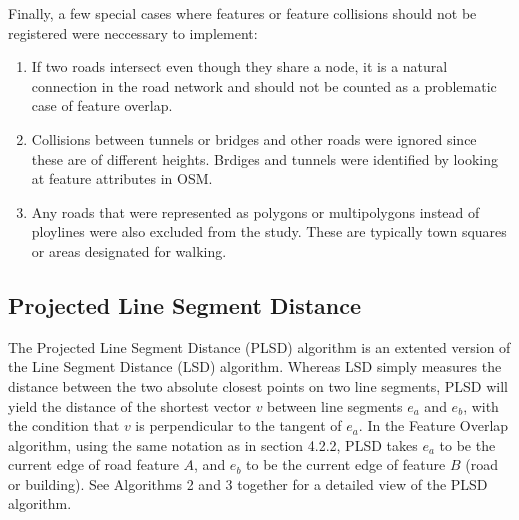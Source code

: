 \documentclass{kththesis}
\begin{document}
Finally, a few special cases where features or feature collisions should not be registered were neccessary to implement:
\begin{enumerate}
    \item If two roads intersect even though they share a node, it is a natural connection in the road network and should not be counted as a problematic case of feature overlap.
    \item Collisions between tunnels or bridges and other roads were ignored since these are of different heights. Brdiges and tunnels were identified by looking at feature attributes in OSM.
    \item Any roads that were represented as polygons or multipolygons instead of ploylines were also excluded from the study. These are typically town squares or areas designated for walking.
\end{enumerate}

\subsection{Projected Line Segment Distance}

The Projected Line Segment Distance (PLSD) algorithm is an extented version of the Line Segment Distance (LSD) algorithm.
Whereas LSD simply measures the distance between the two absolute closest points on two line segments, PLSD will yield the distance of the shortest vector $v$ between line segments $e_a$ and $e_b$, with the condition that $v$ is perpendicular to the tangent of $e_a$.
In the Feature Overlap algorithm, using the same notation as in section 4.2.2, PLSD takes $e_a$ to be the current edge of road feature $A$, and $e_b$ to be the current edge of feature $B$ (road or building).
See Algorithms 2 and 3 together for a detailed view of the PLSD algorithm.
\end{document}
